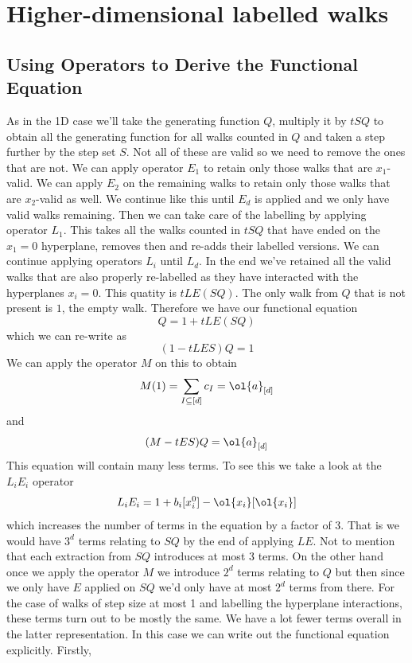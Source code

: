 
\chapter{Higher-dimensional labelled walks}

\section{Using Operators to Derive the Functional Equation}

As in the 1D case we'll take the generating function $Q$, multiply it by $tSQ$ to obtain all the generating function for all walks counted in $Q$ and taken a step further by the step set $S$. Not all of these are valid so we need to remove the ones that are not. We can apply operator $E_1$ to retain only those walks that are $x_1$-valid. We can apply $E_2$ on the remaining walks to retain only those walks that are $x_2$-valid as well. We continue like this until $E_d$ is applied and we only have valid walks remaining. Then we can take care of the labelling by applying operator $L_1$. This takes all the walks counted in $tSQ$ that have ended on the $x_1 = 0$ hyperplane, removes then and re-adds their labelled versions. We can continue applying operators $L_i$ until $L_d$. In the end we've retained all the valid walks that are also properly re-labelled as they have interacted with the hyperplanes $x_i = 0$. This quatity is $tLE(SQ)$. The only walk from $Q$ that is not present is $1$, the empty walk. Therefore we have our functional equation
\[
	Q = 1 + tLE(SQ)
\]
which we can re-write as
\[
	(1-tLES)Q = 1
\]
We can apply the operator $M$ on this to obtain
\[
	M(1) = \sum_{I\subseteq [d]}c_I = \ol{a}_{[d]}
\]
and
\[
   (M-tES)Q = \ol{a}_{[d]}
\]
This equation will contain many less terms. To see this we take a look at the $L_iE_i$ operator
\[
	L_iE_i = 1 + b_i[x_i^0]-\ol{x_i}[\ol{x_i}]
\]
which increases the number of terms in the equation by a factor of 3. That is we would have $3^d$ terms relating to $SQ$ by the end of applying $LE$. Not to mention that each extraction from $SQ$ introduces at most 3 terms. On the other hand once we apply the operator $M$ we introduce $2^d$ terms relating to $Q$ but then since we only have $E$ applied on $SQ$ we'd only have at most $2^d$ terms from there. For the case of walks of step size at most 1 and labelling the hyperplane interactions, these terms turn out to be mostly the same. We have a lot fewer terms overall in the latter representation. In this case we can write out the functional equation explicitly. Firstly,
